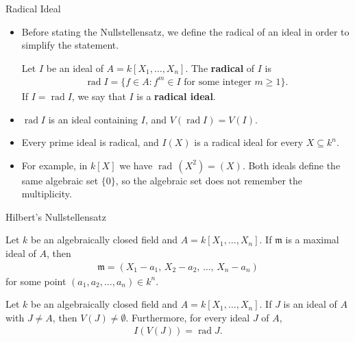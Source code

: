 \documentclass[8pt]{beamer}
\DeclareMathOperator{\rad}{rad}
\newcommand{\mm}{\mathfrak{m}}
\theoremstyle{definition}
\begin{document}
    \begin{frame}{Radical Ideal}
        \begin{itemize}
            \item Before stating the Nullstellensatz, we define the radical of an ideal in order to simplify the statement.
            \begin{definition}
                Let $I$ be an ideal of $A = k[X_1, \ldots, X_n]$. The \textbf{radical} of $I$ is
                \begin{align*}
                    \rad I = \{ f \in A : f^m \in I \text{ for some integer } m \geq 1\}.
                \end{align*}
                If $I = \rad I$, we say that $I$ is a \textbf{radical ideal}.
            \end{definition}
            \item $\rad I$ is an ideal containing $I$, and $V(\rad I) = V(I)$.
            \item Every prime ideal is radical, and $I(X)$ is a radical ideal for every $X \subseteq k^n$.
            \item For example, in $k[X]$ we have $\rad\,(X^2) = (X)$. Both ideals define the same algebraic set $\{0\}$, so the algebraic set does not remember the multiplicity.
        \end{itemize}
    \end{frame}

    \begin{frame}{Hilbert's Nullstellensatz}
        \begin{theorem}
            Let $k$ be an algebraically closed field and $A = k[X_1, \ldots, X_n]$. If $\mm$ is a maximal ideal of $A$, then
            \begin{align*}
                \mm = (X_1 - a_1,\, X_2 - a_2,\, \ldots,\, X_n-a_n)
            \end{align*}
            for some point $(a_1, a_2, \ldots, a_n) \in k^n$.
        \end{theorem}

        \begin{theorem}
            Let $k$ be an algebraically closed field and $A = k[X_1, \ldots, X_n]$. If $J$ is an ideal of $A$ with $J \neq A$, then $V(J) \neq \emptyset$. Furthermore, for every ideal $J$ of $A$,
            \begin{align*}
                I(V(J)) = \rad J.
            \end{align*}
        \end{theorem}
    \end{frame}
\end{document}

